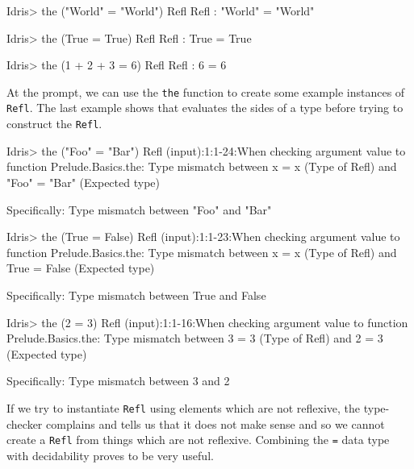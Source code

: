         \begin{code}[label={des:refl-egs}, caption={Examples of reflexivity}]
            Idris> the ("World" = "World") Refl
            Refl : "World" = "World"
            
            
            Idris> the (True = True) Refl
            Refl : True = True
            
            
            Idris> the (1 + 2 + 3 = 6) Refl
            Refl : 6 = 6
        \end{code}
        At the \Idris prompt, we can use the \texttt{the} function to create some example instances of \texttt{Refl}. The last example shows that \Idris evaluates the sides of a type before trying to construct the \texttt{Refl}.
        
        \newpage
        
        \begin{code}[label={des:not-refl}, caption={Things that are not reflexive}, escapeinside={(*}{*)}]
    Idris> the ("Foo" = "Bar") Refl
    (input):1:1-24:When checking argument value to function
    Prelude.Basics.the:
        Type mismatch between
            x = x (Type of Refl)
        and
            "Foo" = "Bar" (Expected type)
    
        Specifically:
            Type mismatch between
                "Foo"
            and
                "Bar"
    
    Idris> the (True = False) Refl
    (input):1:1-23:When checking argument value to function
    Prelude.Basics.the:
        Type mismatch between
            x = x (Type of Refl)
        and
            True = False (Expected type)
    
        Specifically:
            Type mismatch between
                True
            and
                False
    
    
    Idris> the (2 = 3) Refl
    (input):1:1-16:When checking argument value to function
    Prelude.Basics.the:
        Type mismatch between
            3 = 3 (Type of Refl)
        and
            2 = 3 (Expected type)
        
        Specifically:
            Type mismatch between
                3
            and
                2
        \end{code}
        If we try to instantiate \texttt{Refl} using elements which are not reflexive, the type-checker complains and tells us that it does not make sense and so we cannot create a \texttt{Refl} from things which are not reflexive. Combining the \texttt{=} data type with decidability proves to be very useful.

